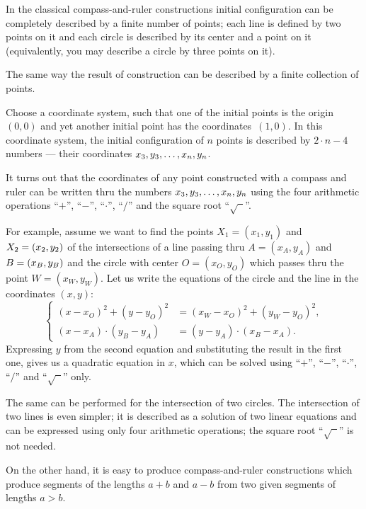 In the classical compass-and-ruler constructions initial configuration can be completely described by a finite number of points;
each line is defined by two points on it and each circle is described by its center and a point on it (equivalently, you may describe a circle by three points on it).

The same way the result of construction can be described by a finite collection of points.

Choose a  coordinate system, such that one of the initial points is the origin $(0,0)$ and yet another initial point has the coordinates~$(1,0)$.
In this coordinate system,
the initial configuration of $n$ points is described by 
$2\cdot n-4$ numbers --- their coordinates $x_3,y_3,\z\dots,x_n,y_n$.

\medskip

It turns out that the coordinates of any point constructed with a compass and ruler
can be written thru the numbers $x_3,y_3,\z\dots,x_n,y_n$ using the four arithmetic operations ``$+$'', ``$-$'', ``$\cdot$'', ``$/$''
and the square root ``$\sqrt{\phantom{a}}$''.

For example, assume we want to find the points $X_1=(x_1,y_1)$ and $X_2\z=(x_2,y_2)$ of the intersections of 
a line passing thru $A=(x_A,y_A)$ and $B\z=(x_B,y_B)$ and
the circle with center $O=(x_O,y_O)$ which passes thru the point $W=(x_W,y_W)$.
Let us write the equations of the circle and the line in the coordinates $(x,y)$:
$$
\left\{
\begin{aligned}
(x-x_O)^2+(y-y_O)^2&=(x_W-x_O)^2+(y_W-y_O)^2,   
\\
(x-x_A)\cdot(y_B-y_A)&=(y-y_A)\cdot(x_B-x_A).
\end{aligned}
\right.
$$
Expressing $y$ from the second equation and substituting the result in the first one, gives us a quadratic equation in $x$, 
which can be solved using ``$+$'', ``$-$'', ``$\cdot$'', ``$/$''
and  ``$\sqrt{\phantom{a}}$'' only.

The same can be performed for the intersection of two circles. 
The intersection of two lines is even simpler; 
it is described as a solution of two linear equations and can be expressed using only four arithmetic operations;
the square root ``$\sqrt{\phantom{a}}$'' is not needed.

\medskip

On the other hand, it is easy to produce  compass-and-ruler constructions which produce segments of the lengths $a+b$ and $a-b$ from two given segments of lengths $a>b$.

